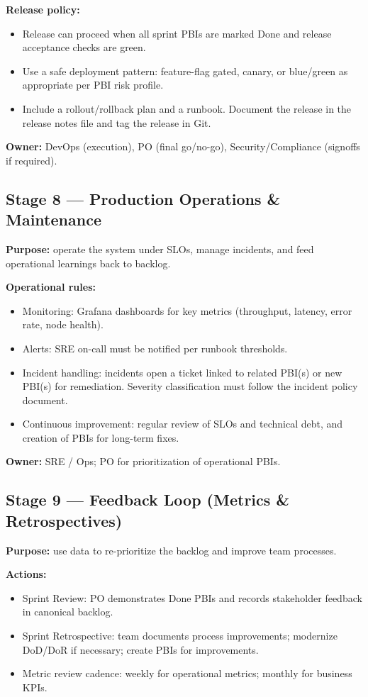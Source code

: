 \documentclass[11pt,a4paper]{article}
\begin{document}
\textbf{Release policy:}
\begin{itemize}
  \item Release can proceed when all sprint PBIs are marked Done and release acceptance checks are green.
  \item Use a safe deployment pattern: feature-flag gated, canary, or blue/green as appropriate per PBI risk profile.
  \item Include a rollout/rollback plan and a runbook. Document the release in the release notes file and tag the release in Git.
\end{itemize}

\textbf{Owner:} DevOps (execution), PO (final go/no-go), Security/Compliance (signoffs if required).

\subsection{Stage 8 — Production Operations \& Maintenance}
\textbf{Purpose:} operate the system under SLOs, manage incidents, and feed operational learnings back to backlog.

\textbf{Operational rules:}
\begin{itemize}
  \item Monitoring: Grafana dashboards for key metrics (throughput, latency, error rate, node health).
  \item Alerts: SRE on-call must be notified per runbook thresholds.
  \item Incident handling: incidents open a ticket linked to related PBI(s) or new PBI(s) for remediation. Severity classification must follow the incident policy document.
  \item Continuous improvement: regular review of SLOs and technical debt, and creation of PBIs for long-term fixes.
\end{itemize}

\textbf{Owner:} SRE / Ops; PO for prioritization of operational PBIs.

\subsection{Stage 9 — Feedback Loop (Metrics \& Retrospectives)}
\textbf{Purpose:} use data to re-prioritize the backlog and improve team processes.

\textbf{Actions:}
\begin{itemize}
  \item Sprint Review: PO demonstrates Done PBIs and records stakeholder feedback in canonical backlog.
  \item Sprint Retrospective: team documents process improvements; modernize DoD/DoR if necessary; create PBIs for improvements.
  \item Metric review cadence: weekly for operational metrics; monthly for business KPIs.
\end{itemize}
\end{document}
